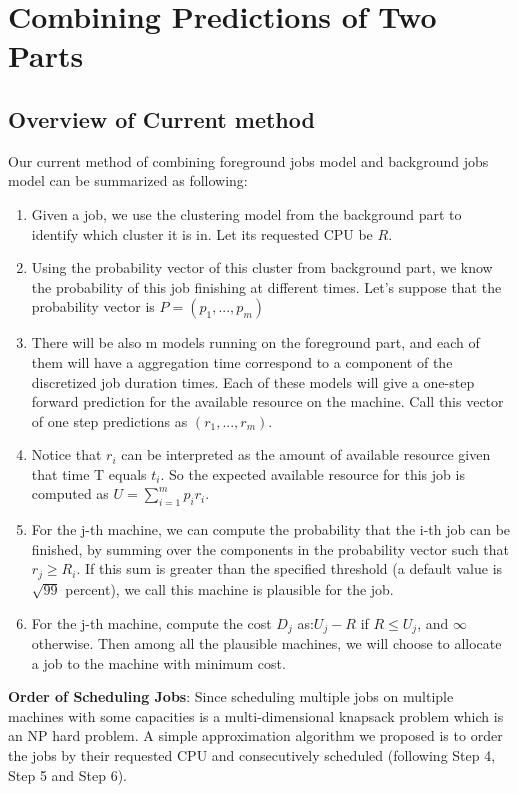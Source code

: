 \documentclass{article}
\begin{document}
\section{Combining Predictions of Two Parts}
\subsection{Overview of Current method}
\begin{flushleft}
Our current method of combining foreground jobs model and background jobs model
can be summarized as following:

\begin{enumerate}[Step 1:]
    \item Given a job, we use the clustering model from the background part to
    identify which cluster it is in. Let its requested CPU be $R$.
    \item Using the probability vector of this cluster from background part, we
    know the probability of this job finishing at different times. Let's suppose
    that the probability vector is $P = (p_{1}, ..., p_{m})$
    \item There will be also m models running on the foreground part, and each
    of them will have a aggregation time correspond to a component of the
    discretized job duration times. Each of these models will give a one-step
    forward prediction for the available resource on the machine. Call this
    vector of one step predictions as $(r_1, ... , r_m)$.
    \item Notice that $r_i$ can be interpreted as the amount of available
    resource given that time T equals $t_i$. So the expected available resource
    for this job is computed as $U = \sum_{i=1}^{m} p_i r_i$.
    \item For the j-th machine, we can compute the probability that the i-th job
    can be finished, by summing over the components in the probability vector
    such that $r_j \geq R_i$. If this sum is greater than the specified
    threshold (a default value is $\sqrt{99}$ percent), we call this machine is
    plausible for the job. 
    \item For the j-th machine, compute the cost $D_j$ as:$U_j - R$ if $R \leq
    U_j$, and $\infty$ otherwise. Then among all the plausible machines, we will
    choose to allocate a job to the machine with minimum cost.
\end{enumerate}

\textbf{Order of Scheduling Jobs}: Since scheduling multiple jobs on multiple
machines with some capacities is a multi-dimensional knapsack problem which is
an NP hard problem. A simple approximation algorithm we proposed is to order the
jobs by their requested CPU and consecutively scheduled (following Step 4, Step
5 and Step 6).


\end{flushleft}
\end{document}
